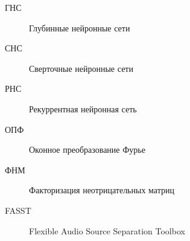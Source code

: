 \Abbreviations %
\begin{description}
\item[ГНС] Глубинные нейронные сети
\item[СНС] Сверточные нейронные сети
\item[РНС] Рекуррентная нейронная сеть
\item[ОПФ] Оконное преобразование Фурье
\item[ФНМ] Факторизация неотрицательных матриц
\item[FASST] Flexible Audio Source Separation Toolbox
\end{description}

